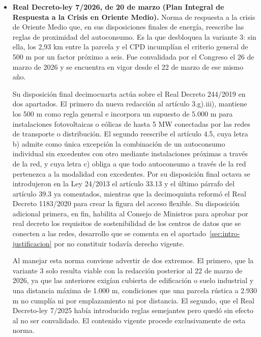 \begin{itemize}
    El matiz es decisivo y conviene explicitarlo. La exención de la primera letra opera por modalidad, no por potencia: una instalación sin excedentes está exenta cualquiera que sea su potencia, mientras que el umbral de 15 kW afecta únicamente a las modalidades con excedentes. Debido a ello las variantes de cubierta y de marquesinas quedan exentas pese a superar con holgura ese umbral. La cadena de citas correcta enlaza dicha disposición adicional segunda con el artículo 17 del Real Decreto 1183/2020, que constituye su desarrollo reglamentario y se remite a ella de forma expresa.

    \item \textbf{Real Decreto-ley 7/2026, de 20 de marzo (Plan Integral de Respuesta a la Crisis en Oriente Medio).} Norma de respuesta a la crisis de Oriente Medio que, en sus disposiciones finales de energía, reescribe las reglas de proximidad del autoconsumo. Es la que desbloquea la variante 3: sin ella, los 2,93 km entre la parcela y el \ac{CPD} incumplían el criterio general de 500 m por un factor próximo a seis. Fue convalidada por el Congreso el 26 de marzo de 2026 y se encuentra en vigor desde el 22 de marzo de ese mismo año.

    Su disposición final decimocuarta actúa sobre el Real Decreto 244/2019 en dos apartados. El primero da nueva redacción al artículo 3.g).iii), mantiene los 500 m como regla general e incorpora un supuesto de 5.000 m para instalaciones fotovoltaicas o eólicas de hasta 5 MW conectadas por las redes de transporte o distribución. El segundo reescribe el artículo 4.5, cuya letra b) admite como única excepción la combinación de un autoconsumo individual sin excedentes con otro mediante instalaciones próximas a través de la red, y cuya letra c) obliga a que todo autoconsumo a través de la red pertenezca a la modalidad con excedentes. Por su disposición final octava se introdujeron en la Ley 24/2013 el artículo 33.13 y el último párrafo del artículo 39.3 ya comentados, mientras que la decimoquinta reformó el Real Decreto 1183/2020 para crear la figura del acceso flexible. Su disposición adicional primera, en fin, habilita al Consejo de Ministros para aprobar por real decreto los requisitos de sostenibilidad de los centros de datos que se conecten a las redes, desarrollo que se comenta en el apartado~\ref{sec:intro-justificacion} por no constituir todavía derecho vigente.

    Al manejar esta norma conviene advertir de dos extremos. El primero, que la variante 3 solo resulta viable con la redacción posterior al 22 de marzo de 2026, ya que las anteriores exigían cubierta de edificación o suelo industrial y una distancia máxima de 1.000 m, condiciones que una parcela rústica a 2.930 m no cumplía ni por emplazamiento ni por distancia. El segundo, que el Real Decreto-ley 7/2025 había introducido reglas semejantes pero quedó sin efecto al no ser convalidado. El contenido vigente procede exclusivamente de esta norma.


\end{itemize}
